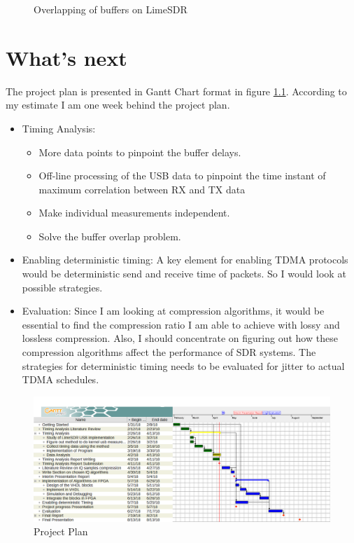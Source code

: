 \documentclass{kththesis}
\begin{document}
\begin{itemize}
{\begin{figure}
\caption{Overlapping of buffers on LimeSDR}
\label{staggering}
\end{figure}
}
\end{itemize}

\chapter{What's next}

The project plan is presented in Gantt Chart format in figure \ref{plan}. According to my estimate I am one week behind the project plan.\\
\begin{itemize}
\item {Timing Analysis:\\
\begin{itemize}
\item {More data points to pinpoint the buffer delays.}
\item {Off-line processing of the USB data to pinpoint the time instant of maximum correlation between RX and TX data}
\item {Make individual measurements independent.}
\item {Solve the buffer overlap problem.}
\end{itemize}}
\item{Enabling deterministic timing: A key element for enabling TDMA protocols would be deterministic send and receive time of packets. So I would look at possible strategies.}
\item{Evaluation: Since I am looking at compression algorithms, it would be essential to find the compression ratio I am able to achieve with lossy and lossless compression. Also, I should concentrate on figuring out how these compression algorithms affect the performance of SDR systems. The strategies for deterministic timing needs to be evaluated for jitter to actual TDMA schedules.}
\end{itemize}
\begin{figure}
\centering
\includegraphics[width=\textheight]{Figure/Project_Plan.png}
\caption{Project Plan}
\label{plan}
\end{figure}

\printbibliography[heading=bibintoc] %

\appendix



\end{document}
